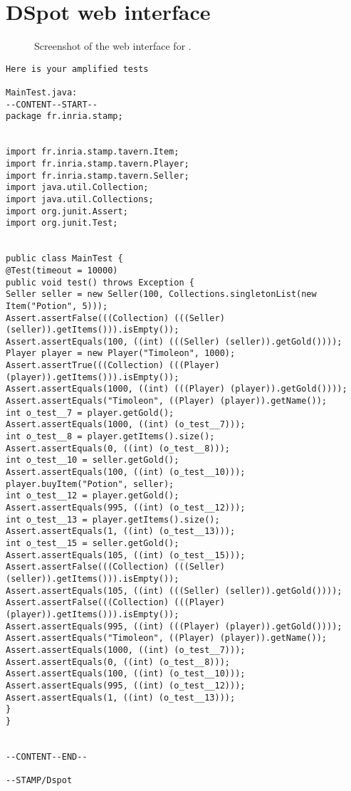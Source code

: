 \chapter{DSpot web interface}

\begin{figure}
	\centering
	\caption{Screenshot of the web interface for \dspot.}
	\label{fig:dspot-web}
\end{figure}

\begin{lstlisting}[label=verbatim-example-report-dspot-web, caption=Example of report provided by dspot web interface.]
Here is your amplified tests 

MainTest.java:
--CONTENT--START-- 
package fr.inria.stamp;


import fr.inria.stamp.tavern.Item;
import fr.inria.stamp.tavern.Player;
import fr.inria.stamp.tavern.Seller;
import java.util.Collection;
import java.util.Collections;
import org.junit.Assert;
import org.junit.Test;


public class MainTest {
@Test(timeout = 10000)
public void test() throws Exception {
Seller seller = new Seller(100, Collections.singletonList(new Item("Potion", 5)));
Assert.assertFalse(((Collection) (((Seller) (seller)).getItems())).isEmpty());
Assert.assertEquals(100, ((int) (((Seller) (seller)).getGold())));
Player player = new Player("Timoleon", 1000);
Assert.assertTrue(((Collection) (((Player) (player)).getItems())).isEmpty());
Assert.assertEquals(1000, ((int) (((Player) (player)).getGold())));
Assert.assertEquals("Timoleon", ((Player) (player)).getName());
int o_test__7 = player.getGold();
Assert.assertEquals(1000, ((int) (o_test__7)));
int o_test__8 = player.getItems().size();
Assert.assertEquals(0, ((int) (o_test__8)));
int o_test__10 = seller.getGold();
Assert.assertEquals(100, ((int) (o_test__10)));
player.buyItem("Potion", seller);
int o_test__12 = player.getGold();
Assert.assertEquals(995, ((int) (o_test__12)));
int o_test__13 = player.getItems().size();
Assert.assertEquals(1, ((int) (o_test__13)));
int o_test__15 = seller.getGold();
Assert.assertEquals(105, ((int) (o_test__15)));
Assert.assertFalse(((Collection) (((Seller) (seller)).getItems())).isEmpty());
Assert.assertEquals(105, ((int) (((Seller) (seller)).getGold())));
Assert.assertFalse(((Collection) (((Player) (player)).getItems())).isEmpty());
Assert.assertEquals(995, ((int) (((Player) (player)).getGold())));
Assert.assertEquals("Timoleon", ((Player) (player)).getName());
Assert.assertEquals(1000, ((int) (o_test__7)));
Assert.assertEquals(0, ((int) (o_test__8)));
Assert.assertEquals(100, ((int) (o_test__10)));
Assert.assertEquals(995, ((int) (o_test__12)));
Assert.assertEquals(1, ((int) (o_test__13)));
}
}


--CONTENT--END--

--STAMP/Dspot
\end{lstlisting}